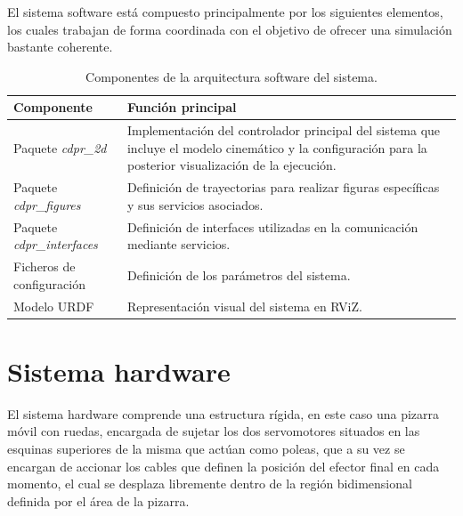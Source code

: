 \vspace{0.25cm}

El sistema software está compuesto principalmente por los siguientes elementos, los cuales trabajan de forma coordinada con el objetivo de ofrecer una simulación bastante coherente.

\begin{table}[h]
    \centering
    \label{tab:mi_tabla}
    \begin{tabularx}{\textwidth}{@{}X X @{}}
        \toprule
        Componente & Función principal \\
        \midrule
        Paquete \textit{cdpr\_2d} & Implementación del controlador principal del sistema que incluye el modelo cinemático y la configuración para la posterior visualización de la ejecución.\newline \\
        Paquete \textit{cdpr\_figures} & Definición de trayectorias para realizar figuras específicas y sus servicios asociados.\newline \\
        Paquete \textit{cdpr\_interfaces} & Definición de interfaces utilizadas en la comunicación mediante servicios.\newline \\
        Ficheros de configuración & Definición de los parámetros del sistema.\newline \\
        Modelo URDF & Representación visual del sistema en RViZ. \\
        \bottomrule
    \end{tabularx}
    \caption{Componentes de la arquitectura software del sistema.}
\end{table}

\newpage

\section{Sistema hardware}
\label{sec:segundaseccion}

El sistema hardware comprende una estructura rígida, en este caso una pizarra móvil con ruedas, encargada de sujetar los dos servomotores situados en las esquinas superiores de la misma que actúan como poleas, que a su vez se encargan de accionar los cables que definen la posición del efector final en cada momento, el cual se desplaza libremente dentro de la región bidimensional definida por el área de la pizarra.

